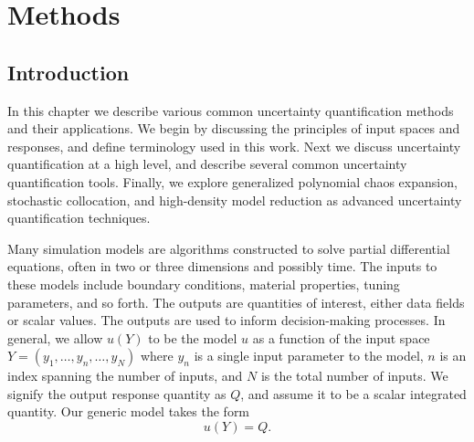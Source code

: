 
\chapter{Methods} %

\label{Chapter3} %



\section{Introduction}
In this chapter we describe various common uncertainty quantification methods and their applications. We begin
by discussing the principles of input spaces and responses, and define terminology used in this work.  Next we
discuss uncertainty quantification at a high level, and describe several common uncertainty quantification
tools.  Finally, we explore generalized polynomial chaos expansion, stochastic collocation, and high-density
model reduction as advanced uncertainty quantification techniques.

Many simulation models are algorithms constructed to solve partial differential equations, often in two or
three dimensions and possibly time.  The inputs to these models include boundary conditions, material
properties, tuning parameters, and so forth.  The outputs are quantities of interest, either data fields or
scalar values.  The outputs are used to inform decision-making processes.  In general, we allow $u(Y)$ to be
the model $u$ as a function of the input space $Y = (y_1,\ldots,y_n,\ldots,y_N)$ where $y_n$ is a single input
parameter to the model, $n$ is an index spanning the number of inputs, and $N$ is the total number of inputs.
We signify the output response quantity as $Q$, and assume it to be a scalar integrated quantity.  Our generic 
model takes the form
\begin{equation}
  u(Y) = Q.
\end{equation}

